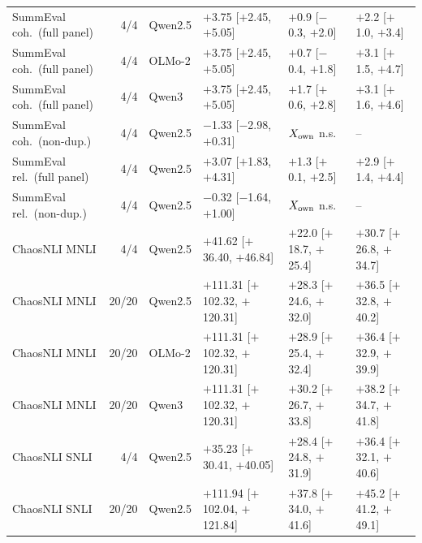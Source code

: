 \begin{table}[t]
{\begin{tabular}{lrllll}
SummEval coh.\ (full panel) & 4/4 & Qwen2.5 & $+$3.75 [$+$2.45, $+$5.05] & $+$0.9 [$-$0.3, $+$2.0] & $+$2.2 [$+$1.0, $+$3.4] \\
SummEval coh.\ (full panel) & 4/4 & OLMo-2 & $+$3.75 [$+$2.45, $+$5.05] & $+$0.7 [$-$0.4, $+$1.8] & $+$3.1 [$+$1.5, $+$4.7] \\
SummEval coh.\ (full panel) & 4/4 & Qwen3 & $+$3.75 [$+$2.45, $+$5.05] & $+$1.7 [$+$0.6, $+$2.8] & $+$3.1 [$+$1.6, $+$4.6] \\
SummEval coh.\ (non-dup.) & 4/4 & Qwen2.5 & $-$1.33 [$-$2.98, $+$0.31] & $X_{\rm own}$ n.s. & -- \\
SummEval rel.\ (full panel) & 4/4 & Qwen2.5 & $+$3.07 [$+$1.83, $+$4.31] & $+$1.3 [$+$0.1, $+$2.5] & $+$2.9 [$+$1.4, $+$4.4] \\
SummEval rel.\ (non-dup.) & 4/4 & Qwen2.5 & $-$0.32 [$-$1.64, $+$1.00] & $X_{\rm own}$ n.s. & -- \\
ChaosNLI MNLI & 4/4 & Qwen2.5 & $+$41.62 [$+$36.40, $+$46.84] & $+$22.0 [$+$18.7, $+$25.4] & $+$30.7 [$+$26.8, $+$34.7] \\
ChaosNLI MNLI & 20/20 & Qwen2.5 & $+$111.31 [$+$102.32, $+$120.31] & $+$28.3 [$+$24.6, $+$32.0] & $+$36.5 [$+$32.8, $+$40.2] \\
ChaosNLI MNLI & 20/20 & OLMo-2 & $+$111.31 [$+$102.32, $+$120.31] & $+$28.9 [$+$25.4, $+$32.4] & $+$36.4 [$+$32.9, $+$39.9] \\
ChaosNLI MNLI & 20/20 & Qwen3 & $+$111.31 [$+$102.32, $+$120.31] & $+$30.2 [$+$26.7, $+$33.8] & $+$38.2 [$+$34.7, $+$41.8] \\
ChaosNLI SNLI & 4/4 & Qwen2.5 & $+$35.23 [$+$30.41, $+$40.05] & $+$28.4 [$+$24.8, $+$31.9] & $+$36.4 [$+$32.1, $+$40.6] \\
ChaosNLI SNLI & 20/20 & Qwen2.5 & $+$111.94 [$+$102.04, $+$121.84] & $+$37.8 [$+$34.0, $+$41.6] & $+$45.2 [$+$41.2, $+$49.1] \\
\bottomrule\end{tabular}}\end{table}